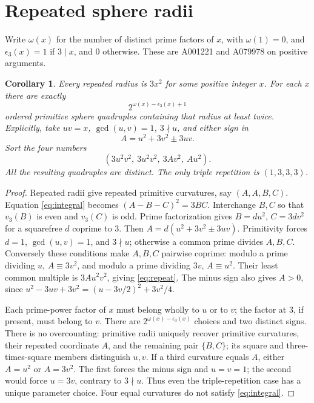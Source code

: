 \documentclass[11pt]{article}
\newtheorem{corollary}[theorem]{Corollary}
\begin{document}
\section{Repeated sphere radii}
Write $\omega(x)$ for the number of distinct prime factors of $x$, with
$\omega(1)=0$, and $\epsilon_3(x)=1$ if $3\mid x$, and $0$ otherwise.
These are A001221 and A079978 on positive arguments.
\begin{corollary}\label{cor:repeat}
Every repeated radius is $3x^2$ for some positive integer $x$.
For each $x$ there are exactly
\[
 2^{\omega(x)-\epsilon_3(x)+1}
\]
ordered primitive sphere quadruples containing that radius at least twice.
Explicitly, take $uv=x$, $\gcd(u,v)=1$, $3\nmid u$, and either sign in
\[
 A=u^2+3v^2\pm3uv.
\]
Sort the four numbers
\begin{equation}\label{eq:repeat}
 (3u^2v^2,\ 3u^2v^2,\ 3Av^2,\ Au^2).
\end{equation}
All the resulting quadruples are distinct. The only triple repetition
is $(1,3,3,3)$.
\end{corollary}
\begin{proof}
Repeated radii give repeated primitive curvatures, say $(A,A,B,C)$.
Equation \eqref{eq:integral} becomes
$(A-B-C)^2=3BC$. Interchange $B,C$ so that $v_3(B)$ is even and
$v_3(C)$ is odd. Prime factorization gives
$B=d u^2$, $C=3d v^2$ for a squarefree $d$ coprime to $3$.
Then $A=d(u^2+3v^2\pm3uv)$. Primitivity forces $d=1$,
$\gcd(u,v)=1$, and $3\nmid u$; otherwise a common prime divides
$A,B,C$. Conversely these conditions make $A,B,C$ pairwise coprime:
modulo a prime dividing $u$, $A\equiv3v^2$, and modulo a prime
dividing $3v$, $A\equiv u^2$.
Their least common multiple is $3Au^2v^2$, giving \eqref{eq:repeat}.
The minus sign also gives $A>0$, since
$u^2-3uv+3v^2=(u-3v/2)^2+3v^2/4$.

Each prime-power factor of $x$ must belong wholly to $u$ or to $v$;
the factor at $3$, if present, must belong to $v$. There are
$2^{\omega(x)-\epsilon_3(x)}$ choices and two distinct signs.
There is no overcounting: primitive radii uniquely recover primitive
curvatures, their repeated coordinate $A$, and the remaining pair
$\{B,C\}$; its square and three-times-square members distinguish $u,v$.
If a third curvature equals $A$, either $A=u^2$ or $A=3v^2$.
The first forces the minus sign and $u=v=1$; the second would force
$u=3v$, contrary to $3\nmid u$. Thus even the triple-repetition case
has a unique parameter choice. Four equal curvatures do not satisfy
\eqref{eq:integral}.
\end{proof}
\end{document}
